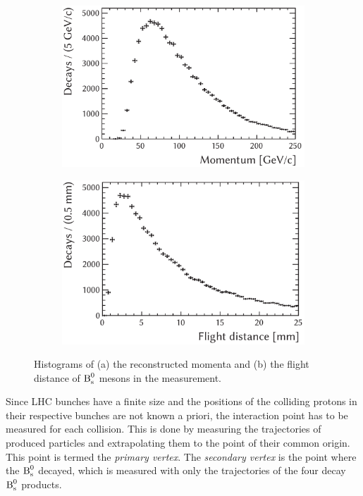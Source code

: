 \begin{figure}[tb]
  \centering
  \begin{subfigure}{0.49\textwidth}
    \includegraphics[width=\textwidth]{graphics/intro/BMomentum}
    \caption{}
    \label{fig:introHists_BMomentum}
  \end{subfigure}%
  \hfill%
  \begin{subfigure}{0.49\textwidth}
    \includegraphics[width=\textwidth]{graphics/intro/flightDist}
    \caption{}
    \label{fig:introHists_flightDist}
  \end{subfigure}
  \caption{Histograms of (a) the reconstructed momenta and (b) the flight distance of $\text{B}_\text{s}^\text{0}$ mesons in the \BstoJpsiKK{} measurement.}
  \label{fig:introHists}
\end{figure}

Since LHC bunches have a finite size and the positions of the colliding protons in their respective bunches are not known a priori, the
interaction point has to be measured for each collision. This is done by measuring the trajectories of produced particles and extrapolating
them to the point of their common origin. This point is termed the \emph{primary vertex}. The \emph{secondary vertex} is the point where
the $\text{B}_\text{s}^\text{0}$ decayed, which is measured with only the trajectories of the four decay $\text{B}_\text{s}^\text{0}$ products.

